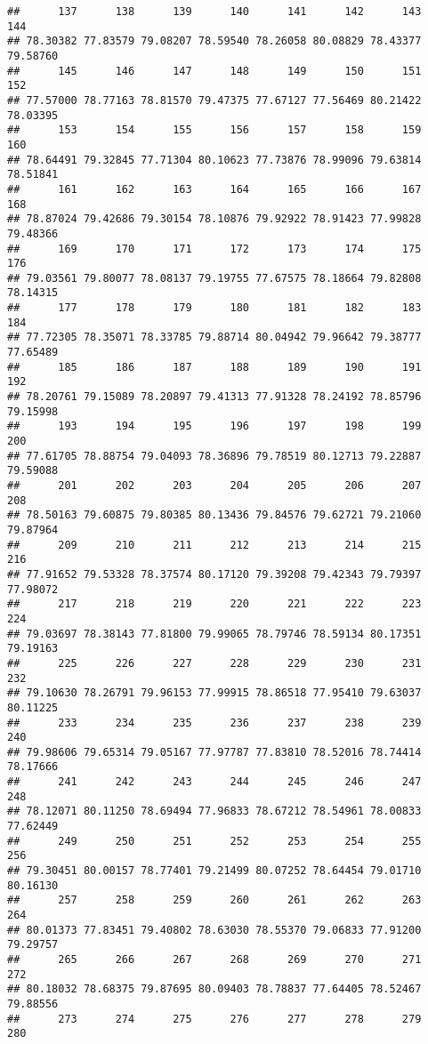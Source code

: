 \documentclass[
]{article}
\begin{document}
\begin{verbatim}
##      137      138      139      140      141      142      143      144 
## 78.30382 77.83579 79.08207 78.59540 78.26058 80.08829 78.43377 79.58760 
##      145      146      147      148      149      150      151      152 
## 77.57000 78.77163 78.81570 79.47375 77.67127 77.56469 80.21422 78.03395 
##      153      154      155      156      157      158      159      160 
## 78.64491 79.32845 77.71304 80.10623 77.73876 78.99096 79.63814 78.51841 
##      161      162      163      164      165      166      167      168 
## 78.87024 79.42686 79.30154 78.10876 79.92922 78.91423 77.99828 79.48366 
##      169      170      171      172      173      174      175      176 
## 79.03561 79.80077 78.08137 79.19755 77.67575 78.18664 79.82808 78.14315 
##      177      178      179      180      181      182      183      184 
## 77.72305 78.35071 78.33785 79.88714 80.04942 79.96642 79.38777 77.65489 
##      185      186      187      188      189      190      191      192 
## 78.20761 79.15089 78.20897 79.41313 77.91328 78.24192 78.85796 79.15998 
##      193      194      195      196      197      198      199      200 
## 77.61705 78.88754 79.04093 78.36896 79.78519 80.12713 79.22887 79.59088 
##      201      202      203      204      205      206      207      208 
## 78.50163 79.60875 79.80385 80.13436 79.84576 79.62721 79.21060 79.87964 
##      209      210      211      212      213      214      215      216 
## 77.91652 79.53328 78.37574 80.17120 79.39208 79.42343 79.79397 77.98072 
##      217      218      219      220      221      222      223      224 
## 79.03697 78.38143 77.81800 79.99065 78.79746 78.59134 80.17351 79.19163 
##      225      226      227      228      229      230      231      232 
## 79.10630 78.26791 79.96153 77.99915 78.86518 77.95410 79.63037 80.11225 
##      233      234      235      236      237      238      239      240 
## 79.98606 79.65314 79.05167 77.97787 77.83810 78.52016 78.74414 78.17666 
##      241      242      243      244      245      246      247      248 
## 78.12071 80.11250 78.69494 77.96833 78.67212 78.54961 78.00833 77.62449 
##      249      250      251      252      253      254      255      256 
## 79.30451 80.00157 78.77401 79.21499 80.07252 78.64454 79.01710 80.16130 
##      257      258      259      260      261      262      263      264 
## 80.01373 77.83451 79.40802 78.63030 78.55370 79.06833 77.91200 79.29757 
##      265      266      267      268      269      270      271      272 
## 80.18032 78.68375 79.87695 80.09403 78.78837 77.64405 78.52467 79.88556 
##      273      274      275      276      277      278      279      280 

\end{verbatim}
\end{document}
